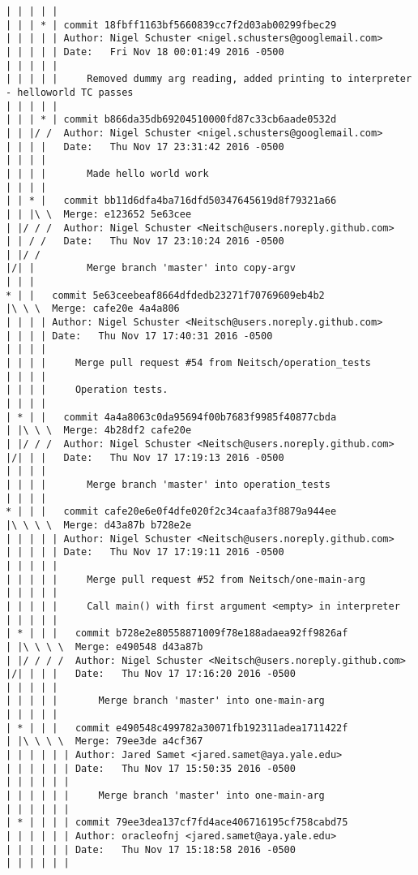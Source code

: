 \begin{lstlisting}
| | | | |      
| | | * | commit 18fbff1163bf5660839cc7f2d03ab00299fbec29
| | | | | Author: Nigel Schuster <nigel.schusters@googlemail.com>
| | | | | Date:   Fri Nov 18 00:01:49 2016 -0500
| | | | | 
| | | | |     Removed dummy arg reading, added printing to interpreter - helloworld TC passes
| | | | |      
| | | * | commit b866da35db69204510000fd87c33cb6aade0532d
| | |/ /  Author: Nigel Schuster <nigel.schusters@googlemail.com>
| | | |   Date:   Thu Nov 17 23:31:42 2016 -0500
| | | |   
| | | |       Made hello world work
| | | |       
| | * |   commit bb11d6dfa4ba716dfd50347645619d8f79321a66
| | |\ \  Merge: e123652 5e63cee
| |/ / /  Author: Nigel Schuster <Neitsch@users.noreply.github.com>
| | / /   Date:   Thu Nov 17 23:10:24 2016 -0500
| |/ /    
|/| |         Merge branch 'master' into copy-argv
| | |      
* | |   commit 5e63ceebeaf8664dfdedb23271f70769609eb4b2
|\ \ \  Merge: cafe20e 4a4a806
| | | | Author: Nigel Schuster <Neitsch@users.noreply.github.com>
| | | | Date:   Thu Nov 17 17:40:31 2016 -0500
| | | | 
| | | |     Merge pull request #54 from Neitsch/operation_tests
| | | |     
| | | |     Operation tests.
| | | |       
| * | |   commit 4a4a8063c0da95694f00b7683f9985f40877cbda
| |\ \ \  Merge: 4b28df2 cafe20e
| |/ / /  Author: Nigel Schuster <Neitsch@users.noreply.github.com>
|/| | |   Date:   Thu Nov 17 17:19:13 2016 -0500
| | | |   
| | | |       Merge branch 'master' into operation_tests
| | | |       
* | | |   commit cafe20e6e0f4dfe020f2c34caafa3f8879a944ee
|\ \ \ \  Merge: d43a87b b728e2e
| | | | | Author: Nigel Schuster <Neitsch@users.noreply.github.com>
| | | | | Date:   Thu Nov 17 17:19:11 2016 -0500
| | | | | 
| | | | |     Merge pull request #52 from Neitsch/one-main-arg
| | | | |     
| | | | |     Call main() with first argument <empty> in interpreter
| | | | |        
| * | | |   commit b728e2e80558871009f78e188adaea92ff9826af
| |\ \ \ \  Merge: e490548 d43a87b
| |/ / / /  Author: Nigel Schuster <Neitsch@users.noreply.github.com>
|/| | | |   Date:   Thu Nov 17 17:16:20 2016 -0500
| | | | |   
| | | | |       Merge branch 'master' into one-main-arg
| | | | |        
| * | | |   commit e490548c499782a30071fb192311adea1711422f
| |\ \ \ \  Merge: 79ee3de a4cf367
| | | | | | Author: Jared Samet <jared.samet@aya.yale.edu>
| | | | | | Date:   Thu Nov 17 15:50:35 2016 -0500
| | | | | | 
| | | | | |     Merge branch 'master' into one-main-arg
| | | | | |       
| * | | | | commit 79ee3dea137cf7fd4ace406716195cf758cabd75
| | | | | | Author: oracleofnj <jared.samet@aya.yale.edu>
| | | | | | Date:   Thu Nov 17 15:18:58 2016 -0500
| | | | | | 

\end{lstlisting}
